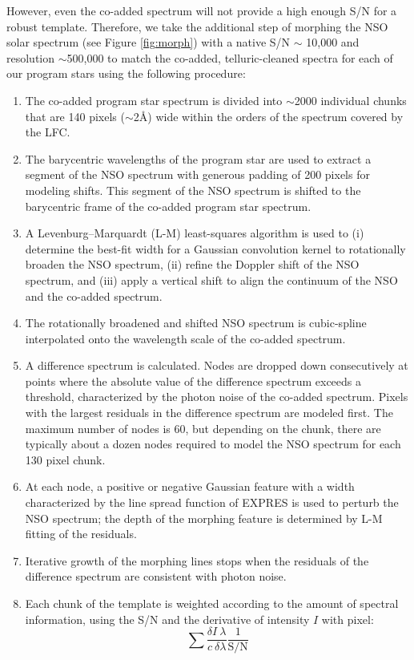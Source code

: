 However, even the co-added spectrum will not provide a high enough S/N for a robust template. Therefore, we take the additional step of morphing the NSO solar spectrum (see Figure \ref{fig:morph}) with a native S/N $\sim$ 10,000 and resolution $\sim$500,000 to match the co-added, telluric-cleaned spectra for each of our program stars using the following procedure:
\begin{enumerate} 
\item The co-added program star spectrum is divided into $\sim$2000 individual chunks that are 140 pixels ($\sim $2\AA) wide within the orders of the spectrum covered by the LFC.
\item The barycentric wavelengths of the program star are used to extract a segment of the NSO spectrum with generous padding of 200 pixels for modeling shifts. This segment of the NSO spectrum is shifted to the barycentric frame of the co-added program star spectrum.
\item A Levenburg--Marquardt (L-M) least-squares algorithm is used to (i) determine the best-fit width for a Gaussian convolution kernel to rotationally broaden the NSO spectrum, (ii) refine the Doppler shift of the NSO spectrum, and (iii) apply a vertical shift to align the continuum of the NSO and the co-added spectrum. 
\item The rotationally broadened and shifted NSO spectrum is cubic-spline interpolated onto the wavelength scale of the co-added spectrum. 
\item A difference spectrum is calculated. Nodes are dropped down consecutively at points where the absolute value of the difference spectrum exceeds a threshold, characterized by the photon noise of the co-added spectrum. Pixels with the largest residuals in the difference spectrum are modeled first. The maximum number of nodes is 60, but depending on the chunk, there are typically about a dozen nodes required to model the NSO spectrum for each 130 pixel chunk. 
\item At each node, a positive or negative Gaussian feature with a width characterized by the line spread function of EXPRES is used to perturb the NSO spectrum; the depth of the morphing feature is determined by L-M fitting of the residuals. 
\item Iterative growth of the morphing lines stops when the residuals of the difference spectrum are consistent with photon noise.
\item Each chunk of the template is weighted according to the amount of spectral information, using the S/N and the derivative of intensity $I$ with pixel:
\begin{equation}
    \sum{\frac{\delta I \ \lambda}{c \ \delta \lambda} \frac{1}{\mathrm{S/N}}}
\end{equation}
\end{enumerate}

